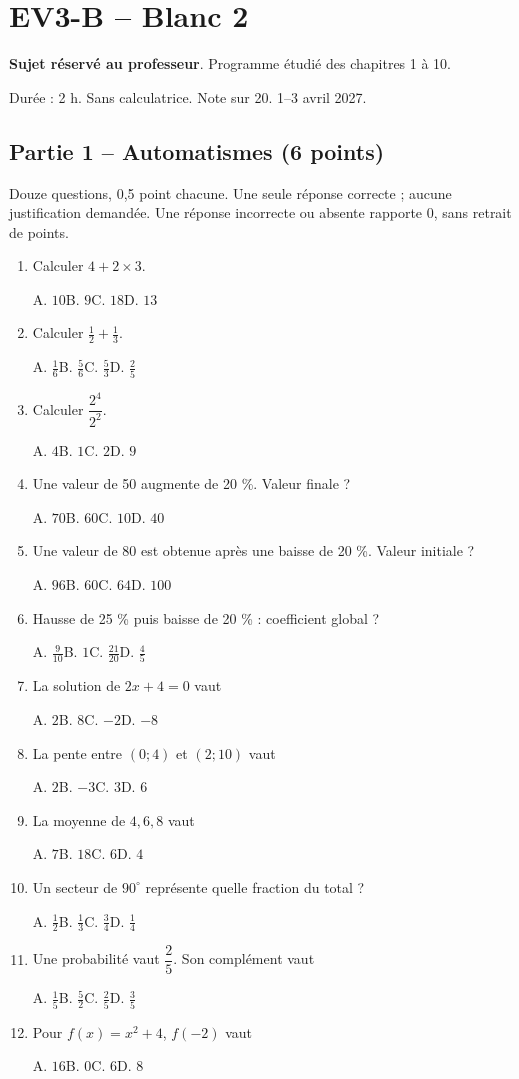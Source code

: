 \mxnewpage\section*{EV3-B -- Blanc 2}\label{EV3-B}
\textbf{Sujet réservé au professeur}. Programme étudié des chapitres 1 à 10.\par Durée : 2 h. Sans calculatrice. Note sur 20. 1–3 avril 2027.
\subsection*{Partie 1 -- Automatismes (6 points)}
Douze questions, 0{,}5 point chacune. Une seule réponse correcte ; aucune justification demandée. Une réponse incorrecte ou absente rapporte 0, sans retrait de points.
\begin{enumerate}
\item Calculer $4+2\times3$.\par A. $10$\quad B. $9$\quad C. $18$\quad D. $13$
\item Calculer $\frac12+\frac13$.\par A. $\frac{1}{6}$\quad B. $\frac{5}{6}$\quad C. $\frac{5}{3}$\quad D. $\frac{2}{5}$
\item Calculer $\dfrac{2^4}{2^{2}}$.\par A. $4$\quad B. $1$\quad C. $2$\quad D. $9$
\item Une valeur de 50 augmente de 20 \%. Valeur finale ?\par A. $70$\quad B. $60$\quad C. $10$\quad D. $40$
\item Une valeur de 80 est obtenue après une baisse de 20 \%. Valeur initiale ?\par A. $96$\quad B. $60$\quad C. $64$\quad D. $100$
\item Hausse de 25 \% puis baisse de 20 \% : coefficient global ?\par A. $\frac{9}{10}$\quad B. $1$\quad C. $\frac{21}{20}$\quad D. $\frac{4}{5}$
\item La solution de $2x+4=0$ vaut\par A. $2$\quad B. $8$\quad C. $-2$\quad D. $-8$
\item La pente entre $(0;4)$ et $(2;10)$ vaut\par A. $2$\quad B. $-3$\quad C. $3$\quad D. $6$
\item La moyenne de $4, 6, 8$ vaut\par A. $7$\quad B. $18$\quad C. $6$\quad D. $4$
\item Un secteur de $90^\circ$ représente quelle fraction du total ?\par A. $\frac{1}{2}$\quad B. $\frac{1}{3}$\quad C. $\frac{3}{4}$\quad D. $\frac{1}{4}$
\item Une probabilité vaut $\dfrac{2}{5}$. Son complément vaut\par A. $\frac{1}{5}$\quad B. $\frac{5}{2}$\quad C. $\frac{2}{5}$\quad D. $\frac{3}{5}$
\item Pour $f(x)=x^2+4$, $f(-2)$ vaut\par A. $16$\quad B. $0$\quad C. $6$\quad D. $8$
\end{enumerate}

